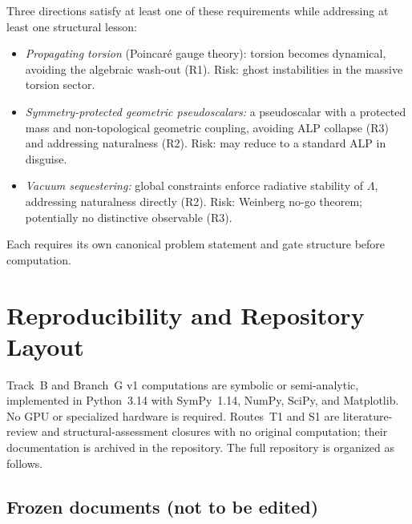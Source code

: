\documentclass[11pt,letterpaper]{article}
\begin{document}
Three directions satisfy at least one of these requirements while addressing
at least one structural lesson:
\begin{itemize}
  \item \emph{Propagating torsion} (Poincar\'e gauge theory): torsion becomes
    dynamical, avoiding the algebraic wash-out (R1). Risk: ghost
    instabilities in the massive torsion sector.
  \item \emph{Symmetry-protected geometric pseudoscalars:} a pseudoscalar
    with a protected mass and non-topological geometric coupling, avoiding
    ALP collapse (R3) and addressing naturalness (R2). Risk: may reduce
    to a standard ALP in disguise.
  \item \emph{Vacuum sequestering:} global constraints enforce radiative
    stability of $\Lambda$, addressing naturalness directly (R2). Risk:
    Weinberg no-go theorem; potentially no distinctive observable (R3).
\end{itemize}
Each requires its own canonical problem statement and gate structure before
computation.


\section{Reproducibility and Repository Layout}\label{sec:reproducibility}

Track~B and Branch~G v1 computations are symbolic or semi-analytic,
implemented in Python~3.14 with SymPy~1.14, NumPy, SciPy, and Matplotlib.
No GPU or specialized hardware is required. Routes~T1 and S1 are
literature-review and structural-assessment closures with no original
computation; their documentation is archived in the repository. The full
repository is organized as follows.

\subsection{Frozen documents (not to be edited)}
\end{document}
